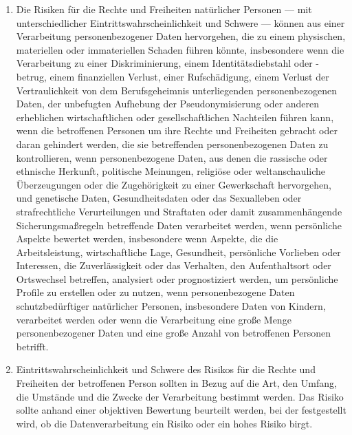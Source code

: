\begin{enumerate}

   \item Die Risiken für die Rechte und Freiheiten natürlicher Personen — mit unterschiedlicher
    Eintrittswahrscheinlichkeit und Schwere — können aus einer Verarbeitung personenbezogener Daten hervorgehen, die zu
    einem physischen, materiellen oder immateriellen Schaden führen könnte, insbesondere wenn die Verarbeitung zu einer
    Diskriminierung, einem Identitätsdiebstahl oder -betrug, einem finanziellen Verlust, einer Rufschädigung, einem
    Verlust der Vertraulichkeit von dem Berufsgeheimnis unterliegenden personenbezogenen Daten, der unbefugten
    Aufhebung der Pseudonymisierung oder anderen erheblichen wirtschaftlichen oder gesellschaftlichen Nachteilen führen
    kann, wenn die betroffenen Personen um ihre Rechte und Freiheiten gebracht oder daran gehindert werden, die sie
    betreffenden personenbezogenen Daten zu kontrollieren, wenn personenbezogene Daten, aus denen die rassische oder
    ethnische Herkunft, politische Meinungen, religiöse oder weltanschauliche Überzeugungen oder die Zugehörigkeit zu
    einer Gewerkschaft hervorgehen, und genetische Daten, Gesundheitsdaten oder das Sexualleben oder strafrechtliche
    Verurteilungen und Straftaten oder damit zusammenhängende Sicherungsmaßregeln betreffende Daten verarbeitet werden,
    wenn persönliche Aspekte bewertet werden, insbesondere wenn Aspekte, die die Arbeitsleistung, wirtschaftliche Lage,
    Gesundheit, persönliche Vorlieben oder Interessen, die Zuverlässigkeit oder das Verhalten, den Aufenthaltsort oder
    Ortswechsel betreffen, analysiert oder prognostiziert werden, um persönliche Profile zu erstellen oder zu nutzen,
    wenn personenbezogene Daten schutzbedürftiger natürlicher Personen, insbesondere Daten von Kindern, verarbeitet
    werden oder wenn die Verarbeitung eine große Menge personenbezogener Daten und eine große Anzahl von betroffenen
    Personen betrifft.%
   \label{itm:eg-75}
   

   \item Eintrittswahrscheinlichkeit und Schwere des Risikos für die Rechte und Freiheiten der betroffenen Person
    sollten in Bezug auf die Art, den Umfang, die Umstände und die Zwecke der Verarbeitung bestimmt werden. Das Risiko
    sollte anhand einer objektiven Bewertung beurteilt werden, bei der festgestellt wird, ob die Datenverarbeitung ein
    Risiko oder ein hohes Risiko birgt.%
   \label{itm:eg-76}
   

\end{enumerate}
